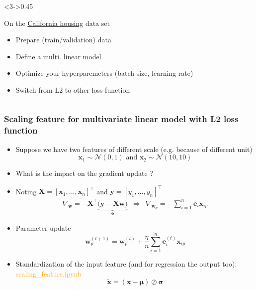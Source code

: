\documentclass[pressentation,10pt,aspectratio=169,xcolor=table, colorlinks=true]{beamer}
\begin{document}
\begin{frame}[fragile]
\begin{columns}
    \begin{column}<3->{0.45\linewidth}
      \begin{work}
        On the \href{https://scikit-learn.org/stable/modules/generated/sklearn.datasets.fetch_california_housing.html#sklearn.datasets.fetch_california_housing}{California housing} data set
        \begin{itemize}
        \item Prepare (train/validation) data
        \item Define a multi. linear model
        \item Optimize your hyperparemeters (batch size, learning rate)
        \item Switch from L2 to other loss function
        \end{itemize}
      \end{work}
    \end{column}
  \end{columns}
  
\end{frame}

\begin{frame}[label={scale_frame}]
  \frametitle{Scaling feature for multivariate linear model with L2 loss function}
  \begin{itemize}
  \item Suppose we have two features of different scale (e.g. because of different unit)
    \[\mathbf{x}_1 \sim \mathcal{N}(0,1) \text{ and } \mathbf{x}_2 \sim \mathcal{N}(10, 10)\]
  \item What is the impact on the gradient update ?
  \item <2-> Noting \(\mathbf{X} = [\mathbf{x}_1, \ldots, \mathbf{x}_n]^\top\) and \(\mathbf{y} = [y_1, \ldots, y_n]^\top\)
    \begin{align*}
      \nabla_{\mathbf{w}} = -\mathbf{X}^\top\underbrace{\big(\mathbf{y} - \mathbf{X}\mathbf{w}\big)}_{\mathbf{e}}   &\Rightarrow& \nabla_{\mathbf{w}_p}= -\sum_{i=1}^n\mathbf{e}_i\mathbf{x}_{ip}
    \end{align*}
  \item <2-> Parameter update
    \[\mathbf{w}_p^{(t+1)} = \mathbf{w}_p^{(t)} + \frac{\eta}{n}\sum_{i=1}^n\mathbf{e}_i^{(t)}\mathbf{x}_{ip}\]
    
  \item <3> Standardization of the input feature (and for regression the output too): \textcolor{orange}{scaling\_feature.ipynb}
    \[\tilde{\mathbf{x}} = (\mathbf{x}-\boldsymbol{\mu})\oslash\boldsymbol{\sigma}\]
  \end{itemize}
  
  
\end{frame}
\end{document}
